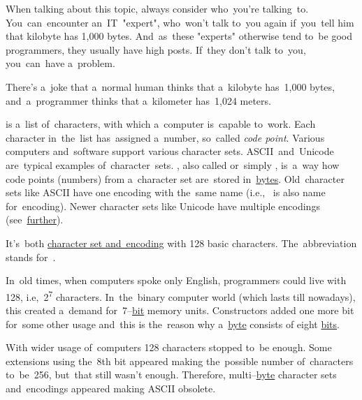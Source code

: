 When talking about this topic, always consider who~you're talking~to.
You~can~encounter an~IT~"expert", who~won't talk to~you again if~you~tell him that kilobyte has 1,000 bytes.
And~as~these "experts" otherwise tend to~be good programmers, they usually have high posts.
If~they don't talk to~you, you~can~have a~problem.

There's a~joke that a~normal human thinks that a~kilobyte has~1,000 bytes, and~a~programmer thinks that a~kilometer has~1,024 meters.

\enlargethispage{20mm}
\thispagestyle{empty}
\label{charactersetencoding}
\begin{itemize}
     is a~list of~characters, with which a~computer is~capable to~work.
            Each character in~the~list has~assigned a~number, so~called \textit{code point}.
            Various computers and~software support various character sets.
            \mbox{ASCII and Unicode} are~typical examples of~character~sets.
    , also called  or~simply , is~a~way how code points (numbers) from a~character set are~stored in~\hyperref[bitsandbytes]{bytes}.
            Old~character sets like ASCII have one encoding with the~same name (i.e.,~ is also name for~encoding).
            Newer character sets like Unicode have multiple encodings (see~\hyperref[utf]{further}).
\end{itemize}

\label{ascii}
It's~both \hyperref[charactersetencoding]{character set and~encoding} with 128 basic characters.
The~abbreviation stands for~.

In~old times, when computers spoke only English, programmers could live with 128, i.e,~2\textsuperscript{7} characters.
In~the~binary computer world (which lasts till nowadays), this created a~demand for~7--\hyperref[bitsandbytes]{bit} memory units.
Constructors added one more bit for~some other usage and~this is the~reason why a~\hyperref[bitsandbytes]{byte} consists of eight \hyperref[bitsandbytes]{bits}.

With wider usage of~computers 128 characters stopped to~be enough.
Some extensions using the~8th bit appeared making the~possible number of~characters to~be~256, but~that still wasn't enough.
Therefore, multi--\hyperref[bitsandbytes]{byte} character sets and~encodings appeared making ASCII obsolete.
\newpage

